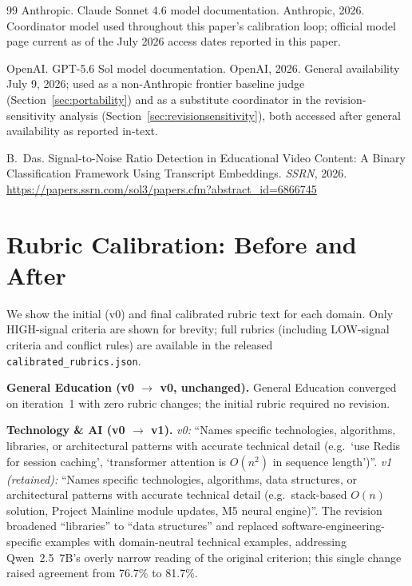 \documentclass[11pt]{article}
\begin{document}
\begin{thebibliography}{99}
Anthropic.
\newblock Claude Sonnet 4.6 model documentation.
\newblock Anthropic, 2026. Coordinator model used throughout this paper's
calibration loop; official model page current as of the July 2026 access
dates reported in this paper.

OpenAI.
\newblock GPT-5.6 Sol model documentation.
\newblock OpenAI, 2026. General availability July 9, 2026; used as a
non-Anthropic frontier baseline judge (Section~\ref{sec:portability}) and
as a substitute coordinator in the revision-sensitivity analysis
(Section~\ref{sec:revisionsensitivity}), both accessed after general
availability as reported in-text.

B.~Das.
\newblock Signal-to-Noise Ratio Detection in Educational Video Content: A
Binary Classification Framework Using Transcript Embeddings.
\newblock \emph{SSRN}, 2026.
\newblock \url{https://papers.ssrn.com/sol3/papers.cfm?abstract_id=6866745}

\end{thebibliography}

\appendix
\section{Rubric Calibration: Before and After}
\label{app:rubrics}

We show the initial (v0) and final calibrated rubric text for each domain.
Only HIGH-signal criteria are shown for brevity; full rubrics (including
LOW-signal criteria and conflict rules) are available in the released
\texttt{calibrated\_rubrics.json}.

\textbf{General Education (v0 $\to$ v0, unchanged).} General Education
converged on iteration~1 with zero rubric changes; the initial rubric
required no revision.

\textbf{Technology \& AI (v0 $\to$ v1).}
\textit{v0:} ``Names specific technologies, algorithms, libraries, or
architectural patterns with accurate technical detail (e.g.\ `use Redis for
session caching', `transformer attention is $O(n^2)$ in sequence
length')''.
\textit{v1 (retained):} ``Names specific technologies, algorithms, data
structures, or architectural patterns with accurate technical detail (e.g.\
stack-based $O(n)$ solution, Project Mainline module updates, M5 neural
engine)''. The revision broadened ``libraries'' to ``data structures'' and
replaced software-engineering-specific examples with domain-neutral
technical examples, addressing Qwen~2.5~7B's overly narrow reading of the
original criterion; this single change raised agreement from 76.7\% to
81.7\%.
\end{document}
